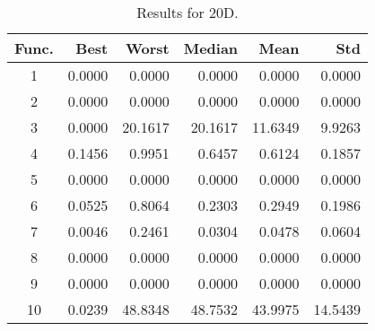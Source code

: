 \begin{table}[ht]
\centering
\caption{ Results for 20D. }
\label{tab:20D}
\begin{tabular}{crrrrr}
\hline
{Func.} & Best & Worst & Median & Mean & Std \\
\hline
1 & 0.0000 & 0.0000 & 0.0000 & 0.0000 & 0.0000 \\
2 & 0.0000 & 0.0000 & 0.0000 & 0.0000 & 0.0000 \\
3 & 0.0000 & 20.1617 & 20.1617 & 11.6349 & 9.9263 \\
4 & 0.1456 & 0.9951 & 0.6457 & 0.6124 & 0.1857 \\
5 & 0.0000 & 0.0000 & 0.0000 & 0.0000 & 0.0000 \\
6 & 0.0525 & 0.8064 & 0.2303 & 0.2949 & 0.1986 \\
7 & 0.0046 & 0.2461 & 0.0304 & 0.0478 & 0.0604 \\
8 & 0.0000 & 0.0000 & 0.0000 & 0.0000 & 0.0000 \\
9 & 0.0000 & 0.0000 & 0.0000 & 0.0000 & 0.0000 \\
10 & 0.0239 & 48.8348 & 48.7532 & 43.9975 & 14.5439 \\
\hline
\end{tabular}
\end{table}
